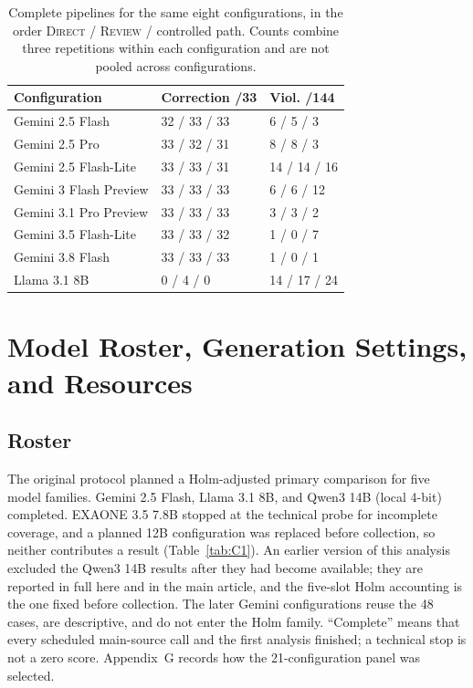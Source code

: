 \documentclass[acmsmall,review]{acmart}
\newcommand{\review}{\textsc{Review}}
\newcommand{\direct}{\textsc{Direct}}
\begin{document}
\begin{table}[H]
\centering
\caption{Complete pipelines for the same eight configurations, in the order \direct{} / \review{} / controlled path. Counts combine three repetitions within each configuration and are not pooled across configurations.}\label{tab:B2}
\small
\setlength{\tabcolsep}{4pt}
\begin{tabular}{@{}lll@{}}
\toprule
\textbf{Configuration} & \textbf{Correction /33} & \textbf{Viol. /144} \\
\midrule
Gemini 2.5 Flash & 32 / 33 / 33 & 6 / 5 / 3 \\
Gemini 2.5 Pro & 33 / 32 / 31 & 8 / 8 / 3 \\
Gemini 2.5 Flash-Lite & 33 / 33 / 31 & 14 / 14 / 16 \\
Gemini 3 Flash Preview & 33 / 33 / 33 & 6 / 6 / 12 \\
Gemini 3.1 Pro Preview & 33 / 33 / 33 & 3 / 3 / 2 \\
Gemini 3.5 Flash-Lite & 33 / 33 / 32 & 1 / 0 / 7 \\
Gemini 3.8 Flash & 33 / 33 / 33 & 1 / 0 / 1 \\
Llama 3.1 8B & 0 / 4 / 0 & 14 / 17 / 24 \\
\bottomrule
\end{tabular}
\end{table}

\FloatBarrier
\setcounter{figure}{0}\setcounter{table}{0}
\renewcommand{\thefigure}{C\arabic{figure}}
\renewcommand{\thetable}{C\arabic{table}}
\section{Model Roster, Generation Settings, and Resources}
\subsection{Roster}
The original protocol planned a Holm-adjusted primary comparison for five model families. Gemini 2.5 Flash, Llama 3.1 8B, and Qwen3 14B (local 4-bit) completed. EXAONE 3.5 7.8B stopped at the technical probe for incomplete coverage, and a planned 12B configuration was replaced before collection, so neither contributes a result (Table~\ref{tab:C1}). An earlier version of this analysis excluded the Qwen3 14B results after they had become available; they are reported in full here and in the main article, and the five-slot Holm accounting is the one fixed before collection. The later Gemini configurations reuse the 48 cases, are descriptive, and do not enter the Holm family. ``Complete'' means that every scheduled main-source call and the first analysis finished; a technical stop is not a zero score. Appendix~G records how the 21-configuration panel was selected.
\end{document}

